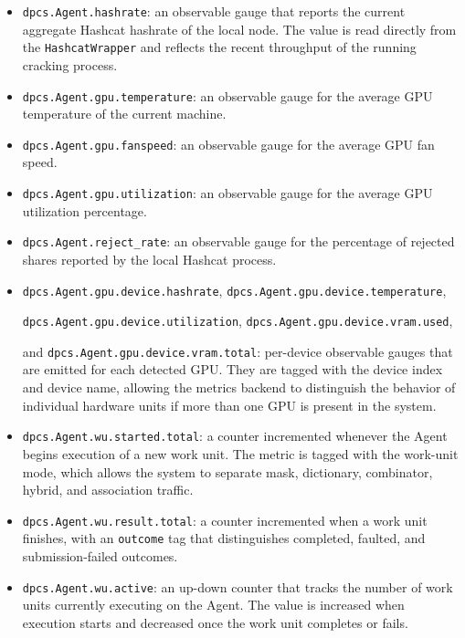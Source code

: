 \begin{itemize}
    \item \verb|dpcs.Agent.hashrate|: an observable gauge that reports the current aggregate Hashcat hashrate of the local node. The value is read directly from the \verb|HashcatWrapper| and reflects the recent throughput of the running cracking process.

    \item \verb|dpcs.Agent.gpu.temperature|: an observable gauge for the average GPU temperature of the current machine.

    \item \verb|dpcs.Agent.gpu.fanspeed|: an observable gauge for the average GPU fan speed.

    \item \verb|dpcs.Agent.gpu.utilization|: an observable gauge for the average GPU utilization percentage.

    \item \verb|dpcs.Agent.reject_rate|: an observable gauge for the percentage of rejected shares reported by the local Hashcat process.

    \item \verb|dpcs.Agent.gpu.device.hashrate|, \verb|dpcs.Agent.gpu.device.temperature|,
    
    \verb|dpcs.Agent.gpu.device.utilization|, \verb|dpcs.Agent.gpu.device.vram.used|,
    
    and \verb|dpcs.Agent.gpu.device.vram.total|: per-device observable gauges that are emitted for each detected GPU. They are tagged with the device index and device name, allowing the metrics backend to distinguish the behavior of individual hardware units if more than one GPU is present in the system.

    \item \verb|dpcs.Agent.wu.started.total|: a counter incremented whenever the Agent begins execution of a new work unit. The metric is tagged with the work-unit mode, which allows the system to separate mask, dictionary, combinator, hybrid, and association traffic.

    \item \verb|dpcs.Agent.wu.result.total|: a counter incremented when a work unit finishes, with an \verb|outcome| tag that distinguishes completed, faulted, and submission-failed outcomes.

    \item \verb|dpcs.Agent.wu.active|: an up-down counter that tracks the number of work units currently executing on the Agent. The value is increased when execution starts and decreased once the work unit completes or fails.


\end{itemize}
